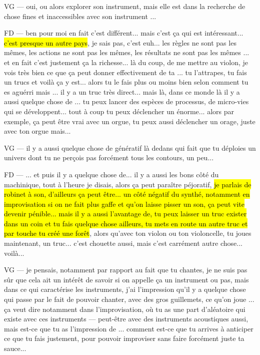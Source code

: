 VG — oui, ou alors explorer son instrument, mais elle est dans la recherche de chose fines et inaccessibles avec son instrument ... 

FD — ben pour moi en fait c'est différent... mais c'est ça qui est intéressant... \hl{c'est presque un autre pays}, je sais pas, c'est euh... les règles ne sont pas les mêmes, les actions ne sont pas les mêmes, les résultats ne sont pas les mêmes ... et en fait c'est justement ça la richesse... là du coup, de me mettre au violon, je vois très bien ce que ça peut donner effectivement de ta ... tu l'attrapes, tu fais un trucs et voilà ça y est... alors tu le fais plus ou moins bien selon comment tu es aguérri mais ... il y a un truc très direct... mais là, dans ce monde là il y a aussi quelque chose de ... tu peux lancer des espèces de processus, de micro-vies qui se développent... tout à coup tu peux déclencher un énorme... alors par exemple, ça peut être vrai avec un orgue, tu peux aussi déclencher un orage, juste avec ton orgue mais... 

VG — il y a aussi quelque chose de génératif là dedans qui fait que tu déploies un univers dont tu ne perçois pas forcément tous les contours, un peu... 

FD — ... et puis il y a quelque chose de... il y a aussi les bons côté du machinique, tout à l'heure je disais, alors ça peut paraître péjoratif, \hl{je parlais de robinet à son, d'ailleurs ça peut être... un côté négatif du synthé, notamment en improvisation si on ne fait plus gaffe et qu'on laisse pisser un son, ça peut vite devenir pénible... mais il y a aussi l'avantage de,  tu peux laisser un truc exister dans un coin et tu fais quelque chose ailleurs, tu mets en route un autre truc et par touche tu créé une forêt}, alors qu'avec ton violon ou ton violoncelle, tu joues maintenant, un truc... c'est chouette aussi, mais c'est carrément autre chose... voilà... 

VG — je pensais, notamment par rapport au fait que tu chantes, je ne suis pas sûr que cela ait un intérêt de savoir si on appelle ça un instrument ou pas, mais dans ce qui caractérise les instruments, j'ai l'impression qu'il y a quelque chose qui passe par le fait de pouvoir chanter, avec des gros guillemets, ce qu'on joue ... ça veut dire notamment dans l'improvisation, où tu as une part d'aléatoire qui existe avec ces instruments — peut-être avec des instruments acoustiques aussi, mais est-ce que tu as l'impression de ... comment est-ce que tu arrives à anticiper ce que tu fais justement, pour pouvoir improviser sans faire forcément juste ta sauce... 

